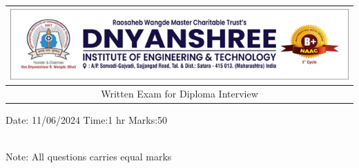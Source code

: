 \documentclass[legalpaper, 12pt, addpoints]{exam}
\begin{document}
\def\arraystretch{2}
\begin{longtable}{lp{}p{}r}
\multicolumn{4}{c}{\includegraphics[width= \textwidth]{dietlogo}} \\ 
\hline 
\multicolumn{4}{c}{Written Exam for Diploma Interview} \\
\end{longtable}
\parbox{5in}{
Date: 11/06/2024 \hfill Time:1 hr  \hfill Marks:50} \\
Note: All questions carries equal marks
\end{document}
